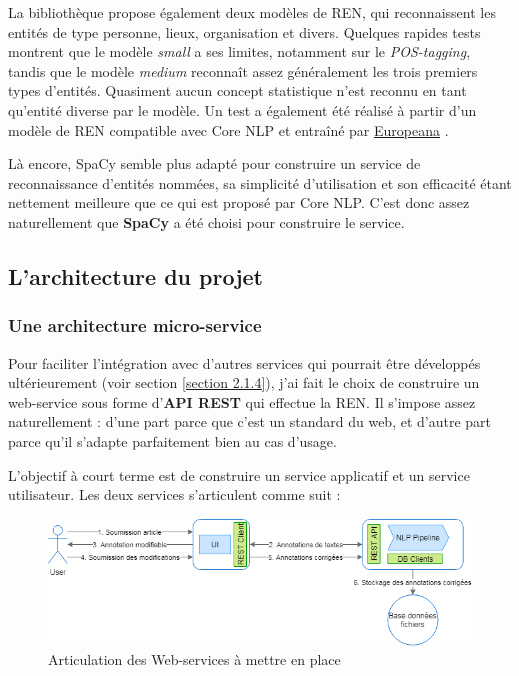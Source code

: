 La bibliothèque propose également deux modèles de REN, qui reconnaissent les entités de type personne, lieux, organisation et divers. Quelques rapides tests montrent que le modèle \textit{small} a ses limites, notamment sur le \textit{POS-tagging}, tandis que le modèle \textit{medium} reconnaît assez généralement les trois premiers types d'entités. Quasiment aucun concept statistique n'est reconnu en tant qu'entité diverse par le modèle. Un test a également été réalisé à partir d'un modèle de REN compatible avec Core NLP et entraîné par \href{http://lab.kbresearch.nl/static/html/eunews.html}{Europeana} \cite{europeana-ner}. %
\newline

Là encore, SpaCy semble plus adapté pour construire un service de reconnaissance d'entités nommées, sa simplicité d'utilisation et son efficacité étant nettement meilleure que ce qui est proposé par Core NLP. C'est donc assez naturellement que \textbf{SpaCy} a été choisi pour construire le service. 
\label{section 3.1.4}

\subsection{L'architecture du projet}

\subsubsection{Une architecture micro-service}
Pour faciliter l'intégration avec d'autres services qui pourrait être développés ultérieurement (voir section \ref{section 2.1.4}), j'ai fait le choix de construire un web-service sous forme d'\textbf{API REST} qui effectue la REN. Il s'impose assez naturellement : d'une part parce que c'est un standard du web, et d'autre part parce qu'il s'adapte parfaitement bien au cas d'usage.
\newline

L'objectif à court terme est de construire un service applicatif et un service utilisateur. Les deux services s'articulent comme suit :
\vspace{20pt}
\begin{figure}[H]
    \centering
\includegraphics[scale=0.62]{images/Archi-pipeline-web.png}
    \caption{Articulation des Web-services à mettre en place}
    \label{fig:archi-pipeline-web}
\end{figure}

